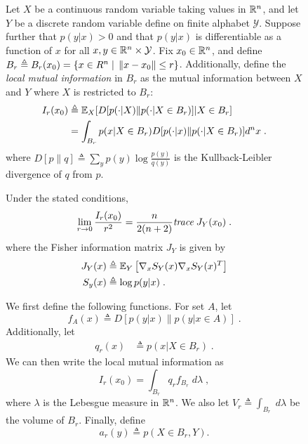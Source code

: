 \documentclass[english]{scrartcl}
\begin{document}
\begin{figure}
	Let $X$ be a continuous random variable taking values in $\mathbb{R}^n$, and let $Y$ be a discrete random variable define on finite alphabet $\mathcal{Y}$. Suppose further that $p(y|x) > 0$ and that $p(y|x)$ is differentiable as a function of $x$ for all $x,y \in \mathbb{R}^n \times \mathcal{Y}$. Fix $x_0 \in \mathbb{R}^n$, and define $B_r \triangleq B_r(x_0) = \{ x \in R^n \;|\; \left\lVert x - x_0\right\rVert \leq r \}$. Additionally, define the \emph{local mutual information} in $B_r$ as the mutual information between $X$ and $Y$ where $X$ is restricted to $B_r$:
		\begin{align*}
			I_r(x_0) &\triangleq \mathbb{E}_X[D[p(\cdot|X)\| p(\cdot|X \in B_r)]|X \in B_r] \\
			&= \int_{B_r} p(x|X \in B_r) D[p(\cdot|x)\| p(\cdot|X \in B_r)] d^n x\;.
		\end{align*}
		where $D[p\|q] \triangleq \sum_{y} p(y) \log \frac{p(y)}{q(y)}$ is the Kullback-Leibler divergence of $q$ from $p$. 

		\begin{thm} \label{thm1}
			Under the stated conditions, 
			\begin{equation*}
				\lim_{r\rightarrow 0} \frac{I_r(x_0)}{r^2} = \frac{n}{2(n+2)} \emph{trace}\; J_Y(x_0)\;.
			\end{equation*}
			where the Fisher information matrix $J_Y$ is given by 
			\begin{align*}
			J_Y(x) &\triangleq \mathbb{E}_Y\left[\nabla_x S_{Y}(x)\nabla_x S_{Y}(x)^T \right] \\
			S_y(x) &\triangleq \log p(y|x)\;.
		\end{align*}
		\end{thm}

	We first define the following functions. For set $A$, let 
	\begin{equation*}
		f_A(x) \triangleq  D[p(y|x) \| p(y|x\in A)] \;.
	\end{equation*}
	Additionally, let 
	\begin{align*}
		q_r(x) &\triangleq p(x|X \in B_r)\;.
	\end{align*}
	We can then write the local mutual information as 
	\begin{equation*}
		I_r(x_0) = \int_{B_r} q_r f_{B_r} \; d\lambda\;,
	\end{equation*}
	where $\lambda$ is the Lebesgue measure in $\mathbb{R}^n$. We also let $V_r \triangleq \int_{B_r} \; d\lambda$ be the volume of $B_r$. Finally, define 
	\begin{equation*}
		a_r(y) \triangleq p(X \in B_r, Y). 
	\end{equation*}


\end{figure}
\end{document}
